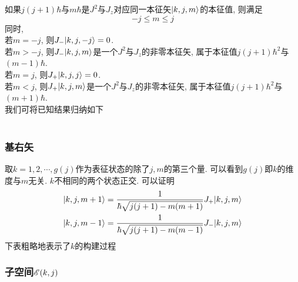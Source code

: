 \documentclass[UTF8]{ctexart}
\numberwithin{equation}{subsection}
\begin{document}
如果$j(j+1)\hbar$与$m\hbar$是$J^2$与$J_z$对应同一本征矢$| {k,j,m} \rangle$的本征值, 则满足
$$\boxed{-j \leq m \leq j}$$
同时, \\
若$m=-j$, 则$J_-| {k,j,-j} \rangle=0$.\\
若$m>-j$, 则$J_-| {k,j,m} \rangle$是一个$J^2$与$J_z$的非零本征矢, 属于本征值$j(j+1)\hbar^2$与$(m-1)\hbar$.\\
若$m=j$, 则$J_+| {k,j,j} \rangle=0$.\\
若$m<j$, 则$J_+| {k,j,m} \rangle$是一个$J^2$与$J_z$的非零本征矢, 属于本征值$j(j+1)\hbar^2$与$(m+1)\hbar$.\\
我们可将已知结果归纳如下\\ \\
\subsubsection*{基右矢}
取$k=1,2,\cdots,g(j)$作为表征状态的除了$j,m$的第三个量. 可以看到$g(j)$即$k$的维度与$m$无关. $k$不相同的两个状态正交. 可以证明
$$\begin{aligned} 
    | {k,j,m+1} \rangle &= \frac{1}{\hbar\sqrt{j(j+1)-m(m+1)}}J_+| {k,j,m} \rangle\\
    | {k,j,m-1} \rangle &= \frac{1}{\hbar\sqrt{j(j+1)-m(m-1)}}J_-| {k,j,m} \rangle
 \end{aligned}$$
下表粗略地表示了$k$的构建过程
\subsubsection*{子空间$\mathscr{E}(k,j)$}



\end{document}
